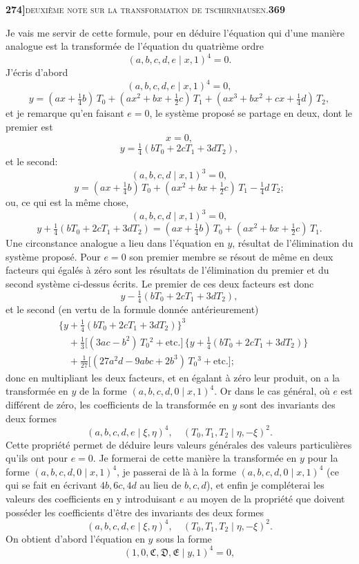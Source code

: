 \documentclass[11pt]{article}
\newcommand{\Cdel}{\mid}
\begin{document}
\newpage
\noindent\textbf{274]}\hfill\textsc{deuxi\`eme note sur la transformation de tschirnhausen.}\hfill\textbf{369}

\medskip

\noindent Je vais me servir de cette formule, pour en d\'eduire l'\'equation qui d'une mani\`ere analogue est la transform\'ee de l'\'equation du quatri\`eme ordre
\[
(a, b, c, d, e \Cdel x, 1)^4 = 0.
\]
J'\'ecris d'abord
\[
(a, b, c, d, e \Cdel x, 1)^4 = 0,
\]
\[
y = (a x + \tfrac{1}{4} b)\, T_0 + (a x^2 + b x + \tfrac{1}{2} c)\, T_1 + (a x^3 + b x^2 + c x + \tfrac{1}{4} d)\, T_2,
\]
et je remarque qu'en faisant $e = 0$, le syst\`eme propos\'e se partage en deux, dont le premier est
\[
x = 0,
\]
\[
y = \tfrac{1}{4}(b T_0 + 2 c T_1 + 3 d T_2),
\]
et le second:
\[
(a, b, c, d \Cdel x, 1)^3 = 0,
\]
\[
y = (a x + \tfrac{1}{4} b)\, T_0 + (a x^2 + b x + \tfrac{1}{2} c)\, T_1 - \tfrac{1}{4} d\, T_2;
\]
ou, ce qui est la m\^eme chose,
\[
(a, b, c, d \Cdel x, 1)^3 = 0,
\]
\[
y + \tfrac{1}{4}(b T_0 + 2 c T_1 + 3 d T_2) = (a x + \tfrac{1}{4} b)\, T_0 + (a x^2 + b x + \tfrac{1}{2} c)\, T_1.
\]
Une circonstance analogue a lieu dans l'\'equation en $y$, r\'esultat de l'\'elimination du syst\`eme propos\'e. Pour $e = 0$ son premier membre se r\'esout de m\^eme en deux facteurs qui \'egal\'es \`a z\'ero sont les r\'esultats de l'\'elimination du premier et du second syst\`eme ci-dessus \'ecrits. Le premier de ces deux facteurs est donc
\[
y - \tfrac{1}{4}(b T_0 + 2 c T_1 + 3 d T_2),
\]
et le second (en vertu de la formule donn\'ee ant\'erieurement)
\[
\begin{aligned}
& \{y + \tfrac{1}{4}(b T_0 + 2 c T_1 + 3 d T_2)\}^3 \\
& \quad + \tfrac{1}{3}\big[(3 a c - b^2)\, T_0{}^2 + \text{etc.}\big]\,\{y + \tfrac{1}{4}(b T_0 + 2 c T_1 + 3 d T_2)\} \\
& \quad + \tfrac{1}{27}\big[(27 a^2 d - 9 a b c + 2 b^3)\, T_0{}^3 + \text{etc.}\big];
\end{aligned}
\]
donc en multipliant les deux facteurs, et en \'egalant \`a z\'ero leur produit, on a la transform\'ee en $y$ de la forme $(a, b, c, d, 0 \Cdel x, 1)^4$. Or dans le cas g\'en\'eral, o\`u $e$ est diff\'erent de z\'ero, les coefficients de la transform\'ee en $y$ sont des invariants des deux formes
\[
(a, b, c, d, e \Cdel \xi, \eta)^4,\quad (T_0, T_1, T_2 \Cdel \eta, -\xi)^2.
\]
Cette propri\'et\'e permet de d\'eduire leurs valeurs g\'en\'erales des valeurs particuli\`eres qu'ils ont pour $e = 0$. Je formerai de cette mani\`ere la transform\'ee en $y$ pour la forme $(a, b, c, d, 0 \Cdel x, 1)^4$, je passerai de l\`a \`a la forme $(a, b, c, d, 0 \Cdel x, 1)^4$ (ce qui se fait en \'ecrivant $4 b, 6 c, 4 d$ au lieu de $b, c, d$), et enfin je compl\'eterai les valeurs des coefficients en y introduisant $e$ au moyen de la propri\'et\'e que doivent poss\'eder les coefficients d'\^etre des invariants des deux formes
\[
(a, b, c, d, e \Cdel \xi, \eta)^4,\quad (T_0, T_1, T_2 \Cdel \eta, -\xi)^2.
\]
On obtient d'abord l'\'equation en $y$ sous la forme
\[
(1, 0, \mathfrak{C}, \mathfrak{D}, \mathfrak{E} \Cdel y, 1)^4 = 0,
\]
\end{document}
